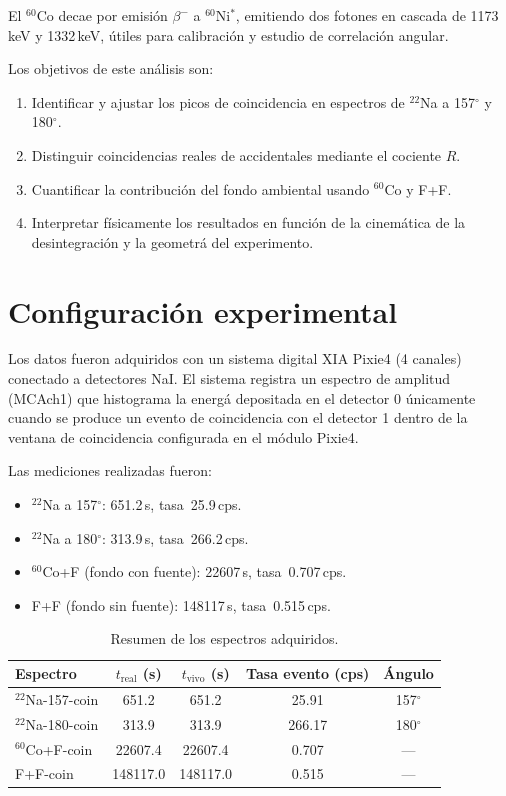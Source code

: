 \documentclass[12pt,a4paper]{article}
\begin{document}
El $^{60}$Co decae por emisi\'on $\beta^-$ a $^{60}$Ni$^*$, emitiendo dos fotones en cascada
de 1173\,keV y 1332\,keV, \'utiles para calibraci\'on y estudio de correlaci\'on angular.

Los objetivos de este an\'alisis son:
\begin{enumerate}
  \item Identificar y ajustar los picos de coincidencia en espectros de $^{22}$Na a 157$^\circ$ y 180$^\circ$.
  \item Distinguir coincidencias reales de accidentales mediante el cociente $R$.
  \item Cuantificar la contribuci\'on del fondo ambiental usando $^{60}$Co y F+F.
  \item Interpretar f\'isicamente los resultados en funci\'on de la cinem\'atica de la desintegraci\'on y la geometr\'a del experimento.
\end{enumerate}

\section{Configuraci\'on experimental}

Los datos fueron adquiridos con un sistema digital XIA Pixie4 (4 canales) conectado a detectores
NaI. El sistema registra un espectro de amplitud (MCAch1) que histograma la energ\'a depositada
en el detector 0 \'unicamente cuando se produce un evento de coincidencia con el detector 1
dentro de la ventana de coincidencia configurada en el m\'odulo Pixie4.

Las mediciones realizadas fueron:
\begin{itemize}
  \item $^{22}$Na a 157$^\circ$: 651.2\,s, tasa~25.9\,cps.
  \item $^{22}$Na a 180$^\circ$: 313.9\,s, tasa~266.2\,cps.
  \item $^{60}$Co+F (fondo con fuente): 22607\,s, tasa~0.707\,cps.
  \item F+F (fondo sin fuente): 148117\,s, tasa~0.515\,cps.
\end{itemize}

\begin{table}[htbp]
\centering
\caption{Resumen de los espectros adquiridos.}
\label{tab:resumen}
\begin{tabular}{lcccc}
\hline \hline
Espectro & $t_{\text{real}}$ (s) & $t_{\text{vivo}}$ (s) & Tasa evento (cps) & \'Angulo \\
\hline
$^{22}$Na-157-coin & 651.2 & 651.2 & 25.91 & 157$^\circ$ \\
$^{22}$Na-180-coin & 313.9 & 313.9 & 266.17 & 180$^\circ$ \\
$^{60}$Co+F-coin    & 22607.4 & 22607.4 & 0.707 & --- \\
F+F-coin           & 148117.0 & 148117.0 & 0.515 & --- \\
\hline
\end{tabular}
\end{table}
\end{document}
